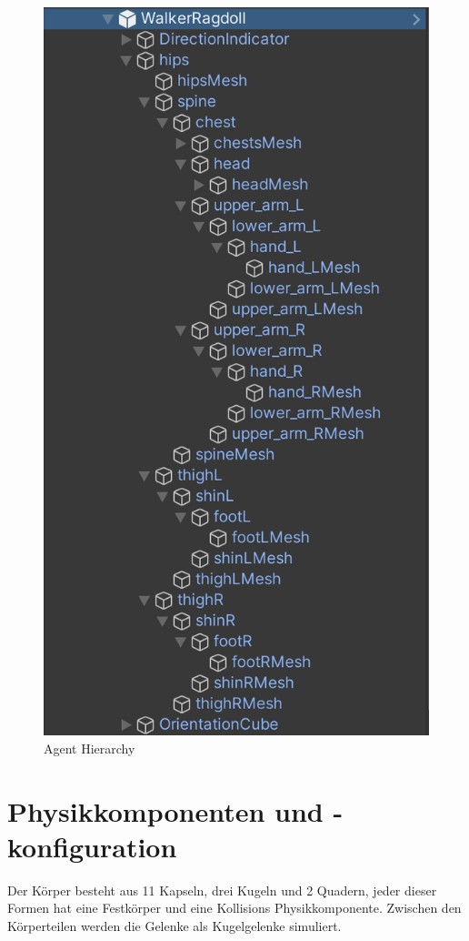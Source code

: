 \begin{figure}[H]
  \centering  
  \includegraphics[scale=0.5]{img/agent_hierarchy.png}
  \caption{Agent Hierarchy}
  \label{fig:agent_hierarchy}
\end{figure}


\section{Physikkomponenten und -konfiguration}
Der Körper besteht aus 11 Kapseln, drei Kugeln und 2 Quadern, jeder dieser Formen hat eine Festkörper und eine Kollisions Physikkomponente. Zwischen den Körperteilen werden die Gelenke als Kugelgelenke simuliert.

